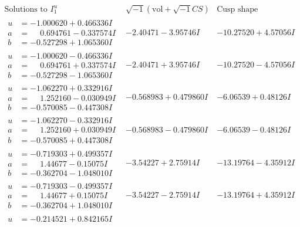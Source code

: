 \documentclass[1p]{elsarticle_modified}
\theoremstyle{definition}
\newcommand{\I}{\sqrt{-1}}
\begin{document}
$$\begin{array}{c|c|c}  
\text{Solutions to }I^u_{1}& \I (\text{vol} + \sqrt{-1}CS) & \text{Cusp shape}\\
 \hline 
\begin{aligned}
u &= -1.000620 + 0.466336 I \\
a &= \phantom{-}0.694761 - 0.337574 I \\
b &= -0.527298 + 1.065360 I\end{aligned}
 & -2.40471 - 3.95746 I & -10.27520 + 4.57056 I \\ \hline\begin{aligned}
u &= -1.000620 - 0.466336 I \\
a &= \phantom{-}0.694761 + 0.337574 I \\
b &= -0.527298 - 1.065360 I\end{aligned}
 & -2.40471 + 3.95746 I & -10.27520 - 4.57056 I \\ \hline\begin{aligned}
u &= -1.062270 + 0.332916 I \\
a &= \phantom{-}1.252160 - 0.030949 I \\
b &= -0.570085 - 0.447308 I\end{aligned}
 & -0.568983 + 0.479860 I & -6.06539 + 0.48126 I \\ \hline\begin{aligned}
u &= -1.062270 - 0.332916 I \\
a &= \phantom{-}1.252160 + 0.030949 I \\
b &= -0.570085 + 0.447308 I\end{aligned}
 & -0.568983 - 0.479860 I & -6.06539 - 0.48126 I \\ \hline\begin{aligned}
u &= -0.719303 + 0.499357 I \\
a &= \phantom{-}1.44677 - 0.15075 I \\
b &= -0.362704 - 1.048010 I\end{aligned}
 & -3.54227 + 2.75914 I & -13.19764 - 4.35912 I \\ \hline\begin{aligned}
u &= -0.719303 - 0.499357 I \\
a &= \phantom{-}1.44677 + 0.15075 I \\
b &= -0.362704 + 1.048010 I\end{aligned}
 & -3.54227 - 2.75914 I & -13.19764 + 4.35912 I \\ \hline\begin{aligned}
u &= -0.214521 + 0.842165 I \\

\end{aligned}
\end{array}$$
\end{document}
